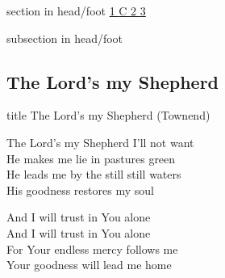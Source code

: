 \documentclass[aspectratio=169]{beamer}
\begin{document}
{
{ 
 {
 \begin{beamercolorbox}[ht=4.5ex,dp=1.5ex,%
      leftskip=.3cm,rightskip=.3cm plus1fil]{section in head/foot}
 \fontsize{12}{25}\selectfont 
\hyperlink{The Lord's my Shepherd['Psalm 23'](Townend)1}{1  }\hyperlink{The Lord's my Shepherd['Psalm 23'](Townend)C}{C  }\hyperlink{The Lord's my Shepherd['Psalm 23'](Townend)2}{2  }\hyperlink{The Lord's my Shepherd['Psalm 23'](Townend)3}{3  } 
 \end{beamercolorbox}%
  \begin{beamercolorbox}[ht=2.5ex,dp=1.125ex,%
   leftskip=.3cm,rightskip=.3cm plus1fil]{subsection in head/foot}
   \insertauthor
 \end{beamercolorbox}%
 }
}
\subsection{The Lord's my Shepherd}
\hypertarget{The Lord's my Shepherd['Psalm 23'](Townend)}{}
\begin{frame}{}
 \vfill
  \centering
  \begin{beamercolorbox}[sep=8pt,center,shadow=true,rounded=true]{title}
    The Lord's my Shepherd (Townend)    
  \end{beamercolorbox}
  \vfill
\end{frame}

\hypertarget{The Lord's my Shepherd['Psalm 23'](Townend)1}{}
\begin{frame}{}
\fontsize{24.324324324324323}{29.189189189189186}\selectfont

The Lord's my Shepherd I'll not want\\ 
He makes me lie in pastures green\\ 
He leads me by the still still waters\\ 
His goodness restores my soul

\end{frame}
\hypertarget{The Lord's my Shepherd['Psalm 23'](Townend)C}{}
\begin{frame}{}
\fontsize{24.324324324324323}{29.189189189189186}\selectfont

And I will trust in You alone\\ 
And I will trust in You alone\\ 
For Your endless mercy follows me\\ 
Your goodness will lead me home


\end{frame}}
\end{document}
